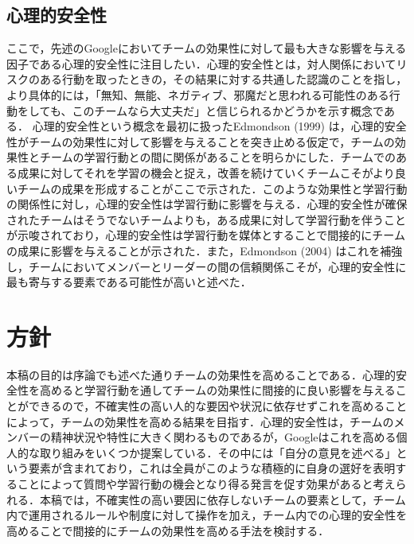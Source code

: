 \documentclass[a4paper, 11pt]{jsarticle}
\begin{document}
\subsection{心理的安全性}
ここで，先述のGoogle\cite{Google}においてチームの効果性に対して最も大きな影響を与える因子である心理的安全性に注目したい．心理的安全性とは，対人関係においてリスクのある行動を取ったときの，その結果に対する共通した認識のことを指し，より具体的には，「無知、無能、ネガティブ、邪魔だと思われる可能性のある行動をしても、このチームなら大丈夫だ」と信じられるかどうかを示す概念である．
心理的安全性という概念を最初に扱ったEdmondson (1999) \cite{Edmondson}は，心理的安全性がチームの効果性に対して影響を与えることを突き止める仮定で，チームの効果性とチームの学習行動との間に関係があることを明らかにした．チームでのある成果に対してそれを学習の機会と捉え，改善を続けていくチームこそがより良いチームの成果を形成することがここで示された．このような効果性と学習行動の関係性に対し，心理的安全性は学習行動に影響を与える．心理的安全性が確保されたチームはそうでないチームよりも，ある成果に対して学習行動を伴うことが示唆されており，心理的安全性は学習行動を媒体とすることで間接的にチームの成果に影響を与えることが示された．また，Edmondson (2004) \cite{Russell}はこれを補強し，チームにおいてメンバーとリーダーの間の信頼関係こそが，心理的安全性に最も寄与する要素である可能性が高いと述べた．

\section{方針}
本稿の目的は序論でも述べた通りチームの効果性を高めることである．心理的安全性を高めると学習行動を通してチームの効果性に間接的に良い影響を与えることができるので，不確実性の高い人的な要因や状況に依存せずこれを高めることによって，チームの効果性を高める結果を目指す．心理的安全性は，チームのメンバーの精神状況や特性に大きく関わるものであるが，Google\cite{GoogleDoc}はこれを高める個人的な取り組みをいくつか提案している．その中には「自分の意見を述べる」という要素が含まれており，これは全員がこのような積極的に自身の選好を表明することによって質問や学習行動の機会となり得る発言を促す効果があると考えられる．本稿では，不確実性の高い要因に依存しないチームの要素として，チーム内で運用されるルールや制度に対して操作を加え，チーム内での心理的安全性を高めることで間接的にチームの効果性を高める手法を検討する．
\end{document}
